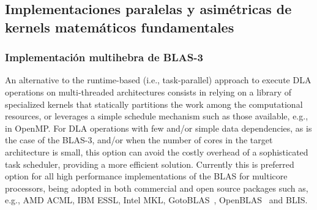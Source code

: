 %


\subsection{Implementaciones paralelas y asimétricas de kernels matemáticos fundamentales}

\subsubsection{Implementación multihebra de BLAS-3}

An alternative to the runtime-based (i.e., task-parallel) approach to execute 
DLA operations on multi-threaded architectures consists in relying on
a library of specialized kernels that statically partitions the work among the computational resources, 
or leverages a simple schedule mechanism such as those available, e.g.,
in OpenMP. For DLA operations with few and/or simple data dependencies, as is the case of the BLAS-3, 
and/or when the number of cores in the target
architecture is small, this option can avoid the costly 
overhead of a sophisticated task scheduler, providing a more efficient solution.
Currently this is preferred option for all high performance implementations of the BLAS for multicore processors,
being adopted in both commercial and open source packages such as, e.g., 
AMD ACML, IBM ESSL, Intel MKL, GotoBLAS~\cite{Goto:2008:AHP}, OpenBLAS~\cite{OpenBLAS} and BLIS.

